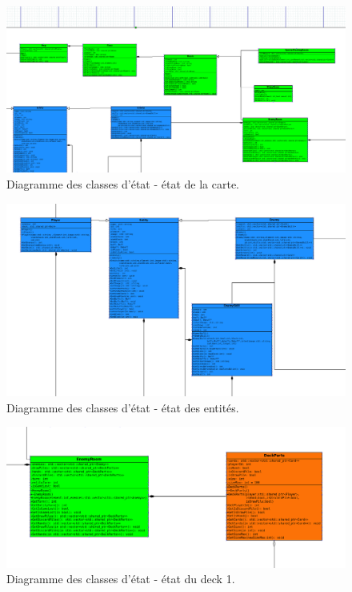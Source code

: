 \begin{landscape}
\begin{figure}[p]
\includegraphics[width=0.8\paperheight]{images/state2.png}
\caption{\label{uml:state}Diagramme des classes d'état - état de la carte.} 
\end{figure}
\end{landscape}
\begin{landscape}
\begin{figure}[p]
\includegraphics[width=0.8\paperheight]{images/state3.png}
\caption{\label{uml:state}Diagramme des classes d'état - état des entités.} 
\end{figure}
\end{landscape}

\begin{landscape}
\begin{figure}[p]
\includegraphics[width=0.8\paperheight]{images/state4.png}
\caption{\label{uml:state}Diagramme des classes d'état - état du deck 1.} 
\end{figure}
\end{landscape}


